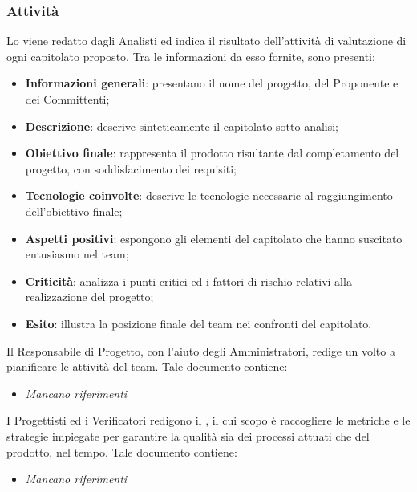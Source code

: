         \subsubsection{Attività}
        Lo \SdF{} viene redatto dagli Analisti ed indica il risultato dell'attività di valutazione di ogni capitolato proposto. Tra le informazioni da esso fornite, sono presenti:
        \begin{itemize}
            \item{\textbf{Informazioni generali}: presentano il nome del progetto, del Proponente e dei Committenti;}
            \item{\textbf{Descrizione}: descrive sinteticamente il capitolato sotto analisi;}
            \item{\textbf{Obiettivo finale}: rappresenta il prodotto risultante dal completamento del progetto, con soddisfacimento dei requisiti;}
            \item{\textbf{Tecnologie coinvolte}: descrive le tecnologie necessarie al raggiungimento dell'obiettivo finale;}
            \item{\textbf{Aspetti positivi}: espongono gli elementi del capitolato che hanno suscitato entusiasmo nel team;}
            \item{\textbf{Criticità}: analizza i punti critici ed i fattori di rischio relativi alla realizzazione del progetto;}
            \item{\textbf{Esito}: illustra la posizione finale del team nei confronti del capitolato.}
        \end{itemize}
        
        Il Responsabile di Progetto, con l'aiuto degli Amministratori, redige un \PdP{} volto a pianificare le attività del team. Tale documento contiene:
        \begin{itemize}
        		\item{\textit{Mancano riferimenti}}
        \end{itemize}
        
        I Progettisti ed i Verificatori redigono il \PdQ{}, il cui scopo è raccogliere le metriche e le strategie impiegate per garantire la qualità sia dei processi attuati che del prodotto, nel tempo. Tale documento contiene:
        \begin{itemize}
        		\item{\textit{Mancano riferimenti}}
        \end{itemize}
        
